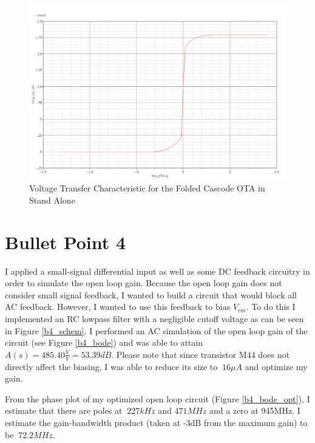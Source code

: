 \documentclass{article}
\begin{document}
\begin{figure}[H]
\centering
\includegraphics[width=6in]{bullet3.png}
\caption{Voltage Transfer Characteristic for the Folded Cascode OTA in Stand Alone}
\label{b3}
\end{figure}
\newpage

\section{Bullet Point 4}
I applied a small-signal differential input as well as some DC feedback circuitry in order to simulate the open loop gain. Because the open loop gain does not consider small signal feedback, I wanted to build a  circuit that would block all AC feedback. However, I wanted to use this feedback to bias $V_{cm}$. To do this I implemented an RC lowpass filter with a negligible cutoff voltage as can be seen in Figure \ref{b4_schem}. I performed an AC simulation of the open loop gain of the circuit (see Figure \ref{b4_bode}) and was able to attain $A(s) = 485.40\frac{V}{V} = 53.39dB$. Please note that since transistor M44 does not directly affect the biasing, I was able to reduce its size to $~16\mu A$ and optimize my gain.

From the phase plot of my optimized open loop circuit (Figure \ref{b4_bode_opt}), I estimate that there are poles at $~227kHz$ and $471MHz$ and a zero at 945MHz. I estimate the gain-bandwidth product (taken at -3dB from the maximum gain) to be $~72.2MHz$.
\end{document}
